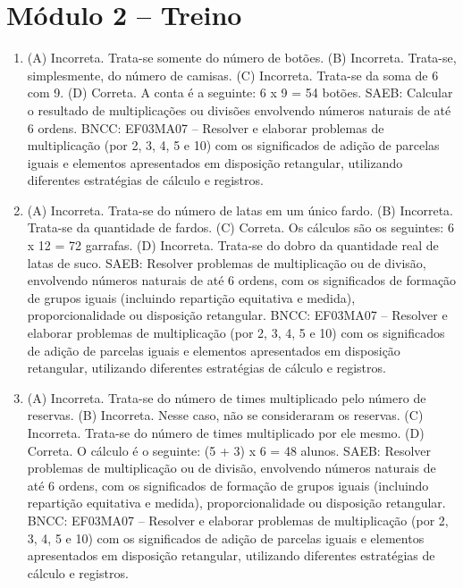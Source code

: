 \section*{Módulo 2 -- Treino}

\begin{enumerate}
\item
(A) Incorreta. Trata-se somente do número de botões.
(B) Incorreta. Trata-se, simplesmente, do número de camisas.
(C) Incorreta. Trata-se da soma de 6 com 9.
(D) Correta. A conta é a seguinte: 6 x 9 = 54 botões.
SAEB: Calcular o resultado de multiplicações ou divisões envolvendo números naturais de até 6 ordens.
BNCC: EF03MA07 – Resolver e elaborar problemas de multiplicação (por 2, 3, 4, 5 e 10) com os
significados de adição de parcelas iguais e elementos apresentados em disposição retangular,
utilizando diferentes estratégias de cálculo e registros.

\item
(A) Incorreta. Trata-se do número de latas em um único fardo.
(B) Incorreta. Trata-se da quantidade de fardos.
(C) Correta. Os cálculos são os seguintes: 6 x 12 = 72 garrafas.
(D) Incorreta. Trata-se do dobro da quantidade real de latas de suco.
SAEB: Resolver problemas de multiplicação ou de divisão, envolvendo números naturais de até 6 ordens, com os significados de formação de grupos iguais (incluindo repartição equitativa e medida), proporcionalidade ou disposição retangular.
BNCC: EF03MA07 – Resolver e elaborar problemas de multiplicação (por 2, 3, 4, 5 e 10) com os
significados de adição de parcelas iguais e elementos apresentados em disposição retangular,
utilizando diferentes estratégias de cálculo e registros.

\item
(A) Incorreta. Trata-se do número de times multiplicado pelo número de reservas.
(B) Incorreta. Nesse caso, não se consideraram os reservas.
(C) Incorreta. Trata-se do número de times multiplicado por ele mesmo.
(D) Correta. O cálculo é o seguinte: (5 + 3) x 6 = 48 alunos.
SAEB: Resolver problemas de multiplicação ou de divisão, envolvendo números naturais de até 6 ordens, com os significados de formação de grupos iguais (incluindo repartição equitativa e medida), proporcionalidade ou disposição retangular.
BNCC: EF03MA07 – Resolver e elaborar problemas de multiplicação (por 2, 3, 4, 5 e 10) com os
significados de adição de parcelas iguais e elementos apresentados em disposição retangular,
utilizando diferentes estratégias de cálculo e registros.
\end{enumerate}

